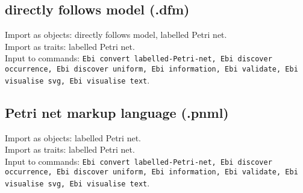{\subsection{directly follows model (.dfm)}
Import as objects: directly follows model, labelled Petri net.
\\Import as traits: labelled Petri net.
\\Input to commands: \texttt{Ebi convert labelled-Petri-net, Ebi discover occurrence, Ebi discover uniform, Ebi information, Ebi validate, Ebi visualise svg, Ebi visualise text}.
\subsection{Petri net markup language (.pnml)}
Import as objects: labelled Petri net.
\\Import as traits: labelled Petri net.
\\Input to commands: \texttt{Ebi convert labelled-Petri-net, Ebi discover occurrence, Ebi discover uniform, Ebi information, Ebi validate, Ebi visualise svg, Ebi visualise text}.
}
\def\ebifilehandlerlist{\begin{itemize}
\item finite language (.lang)
\item labelled Petri net (.lpn)
\item stochastic labelled Petri net (.slpn)
\item finite stochastic language (.slang)
\item stochastic deterministic finite automaton (.sdfa)
\item event log (.xes)
\item compressed event log (.xes.gz)
\item directly follows model (.dfm)
\item Petri net markup language (.pnml)
\end{itemize}}
\def\ebitraitlist{\begin{itemize}
\item event log
\item finite language
\item finite stochastic language
\item iterable stochastic language
\item queriable stochastic language
\item semantics
\item stochastic deterministic semantics
\item stochastic semantics
\item labelled Petri net
\end{itemize}}
\def\ebiobjecttypelist{\begin{itemize}
\item directly follows model
\item event log
\item finite language
\item finite stochastic language
\item labelled Petri net
\item stochastic deterministic finite automaton
\item stochastic labelled Petri net
\end{itemize}}

